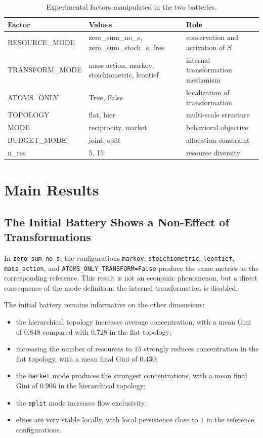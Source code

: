 \documentclass[11pt]{article}
\begin{document}
\begin{table}[H]
\centering
\scriptsize
\begin{tabular}{lll}
\toprule
Factor & Values & Role \\
\midrule
RESOURCE\_MODE & zero\_sum\_no\_s, zero\_sum\_stoch\_s, free & conservation and activation of $S$ \\
TRANSFORM\_MODE & mass action, markov, stoichiometric, leontief & internal transformation mechanism \\
ATOMS\_ONLY & True, False & localization of transformation \\
TOPOLOGY & flat, hier & multi-scale structure \\
MODE & reciprocity, market & behavioral objective \\
BUDGET\_MODE & joint, split & allocation constraint \\
n\_res & 5, 15 & resource diversity \\
\bottomrule
\end{tabular}
\caption{Experimental factors manipulated in the two batteries.}
\end{table}

\section{Main Results}

\subsection{The Initial Battery Shows a Non-Effect of Transformations}

In \texttt{zero\_sum\_no\_s}, the configurations \texttt{markov}, \texttt{stoichiometric}, \texttt{leontief}, \texttt{mass\_action}, and \texttt{ATOMS\_ONLY\_TRANSFORM=False} produce the same metrics as the corresponding reference. This result is not an economic phenomenon, but a direct consequence of the mode definition: the internal transformation is disabled.

The initial battery remains informative on the other dimensions:
\begin{itemize}
    \item the hierarchical topology increases average concentration, with a mean Gini of $0.848$ compared with $0.728$ in the flat topology;
    \item increasing the number of resources to $15$ strongly reduces concentration in the flat topology, with a mean final Gini of $0.430$;
    \item the \texttt{market} mode produces the strongest concentrations, with a mean final Gini of $0.906$ in the hierarchical topology;
    \item the \texttt{split} mode increases flow exclusivity;
    \item elites are very stable locally, with local persistence close to $1$ in the reference configurations.
\end{itemize}
\end{document}
